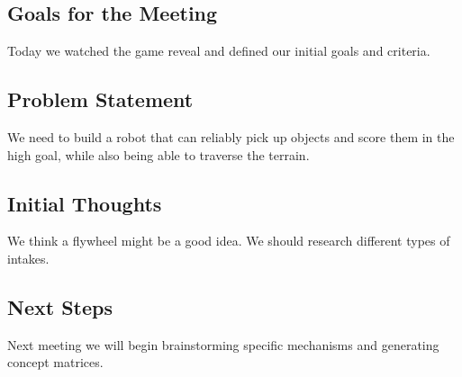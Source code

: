 
\subsection*{Goals for the Meeting}
Today we watched the game reveal and defined our initial goals and criteria.

\subsection*{Problem Statement}
We need to build a robot that can reliably pick up objects and score them in the high goal, while also being able to traverse the terrain.

\subsection*{Initial Thoughts}
We think a flywheel might be a good idea. We should research different types of intakes.



\subsection*{Next Steps}
Next meeting we will begin brainstorming specific mechanisms and generating concept matrices.
